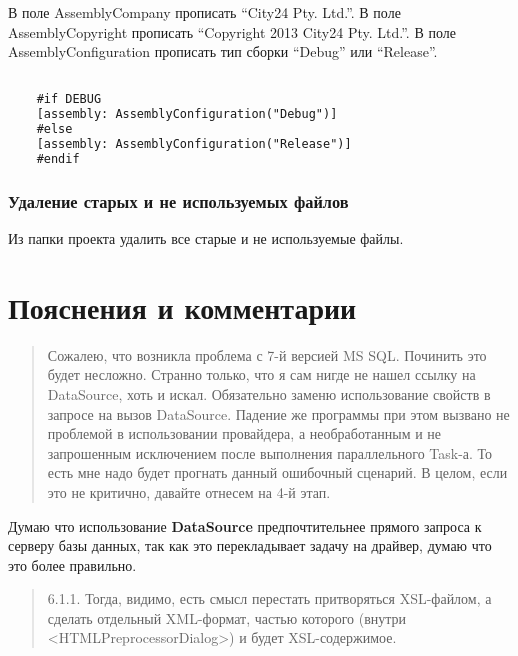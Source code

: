 В поле AssemblyCompany прописать ``City24 Pty. Ltd.''. В поле AssemblyCopyright прописать
``Copyright 2013 City24 Pty. Ltd.''. В поле AssemblyConfiguration прописать тип сборки ``Debug''
или ``Release''.

\begin{lstlisting}[language=XML,label=AssemblyInfo.cs,caption=AssemblyInfo.cs]

	#if DEBUG
	[assembly: AssemblyConfiguration("Debug")]
	#else
	[assembly: AssemblyConfiguration("Release")]
	#endif

\end{lstlisting}

\subsubsection{Удаление старых и не используемых файлов}

Из папки проекта удалить все старые и не используемые файлы.

\section{Пояснения и комментарии}

\begin{quote}

	Сожалею, что возникла проблема с 7-й версией MS SQL. Починить это будет несложно. Странно
	только, что я сам нигде не нашел ссылку на DataSource, хоть и искал. Обязательно заменю
	использование свойств в запросе на вызов DataSource. Падение же программы при этом вызвано не
	проблемой в использовании провайдера, а необработанным и не запрошенным исключением после
	выполнения параллельного Task-а. То есть мне надо будет прогнать данный ошибочный сценарий. В
	целом, если это не критично, давайте отнесем на 4-й этап.

\end{quote}

Думаю что использование \textbf{DataSource} предпочтительнее прямого запроса к серверу базы данных, так как
это перекладывает задачу на драйвер, думаю что это более правильно.

\begin{quote}

	6.1.1. Тогда, видимо, есть смысл перестать притворяться XSL-файлом, а сделать отдельный
	XML-формат, частью которого (внутри <HTMLPreprocessorDialog>) и будет XSL-содержимое.

\end{quote}

